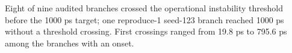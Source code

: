 Eight of nine audited branches crossed the operational instability threshold before the 1000 ps target; one reproduce-1 seed-123 branch reached 1000 ps without a threshold crossing. First crossings ranged from 19.8 ps to 795.6 ps among the branches with an onset.
